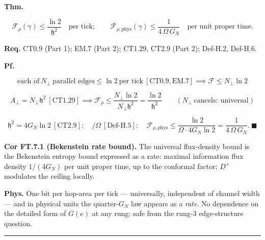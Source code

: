 \begin{theorem}\label{tag:FT-7}
\textbf{Thm.}

\[
\mathcal F_\rho(\gamma)\le\frac{\ln2}{\mathfrak h^2}\quad\text{per tick};\qquad
\mathcal F_{\rho,\mathrm{phys}}(\gamma)\le\frac{1}{4\,\Omega\,G_N}\quad\text{per unit proper time}.
\]

\textbf{Req.} CT0.9 (Part 1); EM.7 (Part 2); CT1.29, CT2.9 (Part 2); Def-H.2, Def-H.6.

\textbf{Pf.}

\[
\text{each of}\ N_\perp\ \text{parallel edges}\le\ln2\ \text{per tick}\ [\mathrm{CT0.9},\mathrm{EM.7}]\implies\mathcal F\le N_\perp\ln2
\]

\[
A_\perp=N_\perp\mathfrak h^2\ [\mathrm{CT1.29}]\implies\mathcal F_\rho\le\frac{N_\perp\ln2}{N_\perp\mathfrak h^2}=\frac{\ln2}{\mathfrak h^2}\qquad(N_\perp\ \text{cancels}:\ \text{universal})
\]

\[
\mathfrak h^2=4G_N\ln2\ [\mathrm{CT2.9}];\quad/\Omega\ [\mathrm{Def\text{-}H.5}]:\quad\mathcal F_{\rho,\mathrm{phys}}\le\frac{\ln2}{\Omega\cdot4G_N\ln2}=\frac{1}{4\,\Omega\,G_N}.\ \blacksquare
\]

\textbf{Cor FT.7.1 (Bekenstein rate bound).} The universal flux-density bound is the Bekenstein entropy bound expressed as a rate: maximal information flux density $1/(4G_N)$ per unit proper time, up to the conformal factor; $D^+$ modulates the ceiling locally.

\textbf{Phys.} One bit per hop-area per tick — universally, independent of channel width — and in physical units the quarter-$G_N$ law appears as a \textit{rate}. No dependence on the detailed form of $G(e)$ at any rung: safe from the rung-3 edge-structure question.

\vspace{2pt}\noindent\rule{\textwidth}{0.4pt}\vspace{2pt}

\end{theorem}


